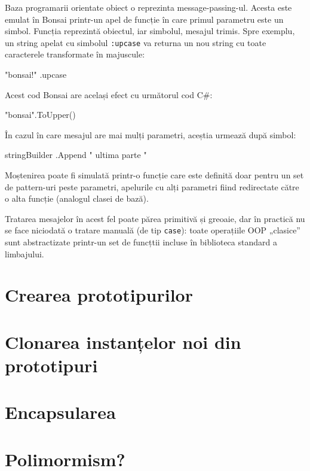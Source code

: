 \documentclass[12pt,a4paper]{memoir}
\begin{document}
\begin{itemize}
Baza programarii orientate obiect o reprezinta message-passing-ul. Acesta este emulat în Bonsai printr-un apel de funcție în care primul parametru este un simbol. Funcția reprezintă obiectul, iar simbolul, mesajul trimis. Spre exemplu, un string apelat cu simbolul \texttt{:upcase} va returna un nou string cu toate caracterele transformate în majuscule:
\begin{code}
"bonsai!" .upcase
\end{code}
Acest cod Bonsai are același efect cu următorul cod C\#:
\begin{code}
"bonsai".ToUpper()
\end{code}
În cazul în care mesajul are mai mulți parametri, aceștia urmează după simbol:
\begin{code}
stringBuilder .Append " ultima parte "
\end{code}

Moștenirea poate fi simulată printr-o funcție care este definită doar pentru un set de pattern-uri peste parametri, apelurile cu alți parametri fiind redirectate către o alta funcție (analogul clasei de bază).

Tratarea mesajelor în acest fel poate părea primitivă și greoaie, dar în practică nu se face niciodată o tratare manuală (de tip \texttt{case}): toate operațiile OOP „clasice” sunt abstractizate printr-un set de funcțtii incluse în biblioteca standard a limbajului.

\section{Crearea prototipurilor}


\section{Clonarea instanțelor noi din prototipuri}


\section{Encapsularea}


\section{Polimormism?}


\end{itemize}
\end{document}
